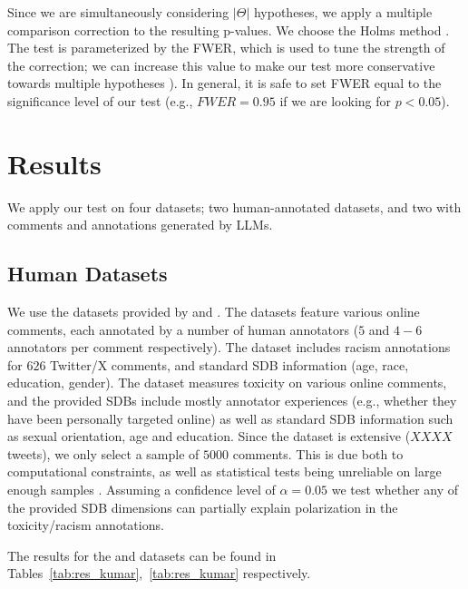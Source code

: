 \documentclass[twocolumn, 8pt]{article}
\begin{document}
Since we are simultaneously considering $\lvert \Theta \rvert$ hypotheses, we apply a multiple comparison correction to the resulting p-values. We choose the Holms method \parencite{holms}. The test is parameterized by the \ac{FWER}, which is used to tune the strength of the correction; we can increase this value to make our test more conservative towards multiple hypotheses \parencite{ChenFengYi2017}). In general, it is safe to set \ac{FWER} equal to the significance level of our test (e.g., $\textit{FWER} = 0.95$ if we are looking for $p < 0.05$).


\section{Results}
\label{sec:results}

We apply our test on four datasets; two human-annotated datasets, and two with comments and annotations generated by \acp{LLM}.

\subsection{Human Datasets}

We use the datasets provided by \textcite{kumar-et-al-2021} and \textcite{sap-etal-2022-annotators}. The datasets feature various online comments, each annotated by a number of human annotators ($5$ and $4-6$ annotators per comment respectively). The \textcite{sap-etal-2022-annotators} dataset includes racism annotations for $626$ Twitter/X comments, and standard \ac{SDB} information (age, race, education, gender). The \textcite{kumar-et-al-2021} dataset measures toxicity on various online comments, and the provided \acp{SDB} include mostly annotator experiences (e.g., whether they have been personally targeted online) as well as standard \ac{SDB} information such as sexual orientation, age and education. Since the dataset is extensive ($XXXX$ tweets), we only select a sample of $5000$ comments. This is due both to computational constraints, as well as statistical tests being unreliable on large enough samples \cite{trafimow2018manipulating}. Assuming a confidence level of $\alpha=0.05$ we test whether any of the provided \ac{SDB} dimensions can partially explain polarization in the toxicity/racism annotations. 

The results for the \textcite{kumar-et-al-2021} and \textcite{sap-etal-2022-annotators} datasets can be found in Tables~\ref{tab:res_kumar},~\ref{tab:res_kumar} respectively.
\end{document}
